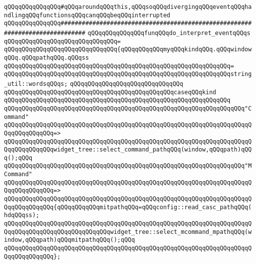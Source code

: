 \verb|qQQqqQQqqQQqqQQq#qQQqaroundqQQqthis,qQQqsoqQQqdivergingqQQqeventqQQqhandlingqQQqfunctionsqQQqcanqQQqbeqQQqinterrupted|\newline
\verb|qQQqqQQqqQQqqQQq#############################################################################|\newline
\newline
\verb|qQQqqQQqqQQqqQQqfunqQQqdo_interpret_eventqQQqs|\newline
\verb|qQQqqQQqqQQqqQQqqQQqqQQqqQQqqQQq=|\newline
\verb|qQQqqQQqqQQqqQQqqQQqqQQqqQQqqQQq{qQQqqQQqqQQqmyqQQqkindqQQq.qQQqwindowqQQq.qQQqpathqQQq.qQQqss|\newline
\verb|qQQqqQQqqQQqqQQqqQQqqQQqqQQqqQQqqQQqqQQqqQQqqQQqqQQqqQQqqQQqqQQq=|\newline
\verb|qQQqqQQqqQQqqQQqqQQqqQQqqQQqqQQqqQQqqQQqqQQqqQQqqQQqqQQqqQQqqQQqstring_util::wordsqQQqs;|\newline
\verb|qQQqqQQqqQQqqQQqqQQqqQQqqQQqqQQq|\newline
\verb|qQQqqQQqqQQqqQQqqQQqqQQqqQQqqQQqqQQqqQQqqQQqqQQqcaseqQQqkind|\newline
\verb|qQQqqQQqqQQqqQQqqQQqqQQqqQQqqQQqqQQqqQQqqQQqqQQqqQQqqQQqqQQqqQQq|\newline
\verb|qQQqqQQqqQQqqQQqqQQqqQQqqQQqqQQqqQQqqQQqqQQqqQQqqQQqqQQqqQQqqQQqqQQq"Command"|\newline
\verb|qQQqqQQqqQQqqQQqqQQqqQQqqQQqqQQqqQQqqQQqqQQqqQQqqQQqqQQqqQQqqQQqqQQqqQQqqQQqqQQqqQQq=>|\newline
\verb|qQQqqQQqqQQqqQQqqQQqqQQqqQQqqQQqqQQqqQQqqQQqqQQqqQQqqQQqqQQqqQQqqQQqqQQqqQQqqQQqqQQqwidget_tree::select_command_pathqQQq(window,qQQqpath)qQQq();qQQq|\newline
\newline
\verb|qQQqqQQqqQQqqQQqqQQqqQQqqQQqqQQqqQQqqQQqqQQqqQQqqQQqqQQqqQQqqQQqqQQq"MCommand"|\newline
\verb|qQQqqQQqqQQqqQQqqQQqqQQqqQQqqQQqqQQqqQQqqQQqqQQqqQQqqQQqqQQqqQQqqQQqqQQqqQQqqQQqqQQq=>|\newline
\verb|qQQqqQQqqQQqqQQqqQQqqQQqqQQqqQQqqQQqqQQqqQQqqQQqqQQqqQQqqQQqqQQqqQQqqQQqqQQqqQQqqQQq{qQQqqQQqqQQqmitpathqQQq=qQQqconfig::read_casc_pathqQQq(hdqQQqss);|\newline
\verb|qQQqqQQqqQQqqQQqqQQqqQQqqQQqqQQqqQQqqQQqqQQqqQQqqQQqqQQqqQQqqQQqqQQqqQQqqQQqqQQqqQQqqQQqqQQqqQQqqQQqwidget_tree::select_mcommand_mpathqQQq(window,qQQqpath)qQQqmitpathqQQq();qQQq|\newline
\verb|qQQqqQQqqQQqqQQqqQQqqQQqqQQqqQQqqQQqqQQqqQQqqQQqqQQqqQQqqQQqqQQqqQQqqQQqqQQqqQQqqQQq};|\newline
